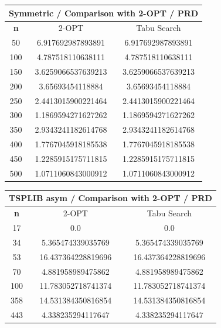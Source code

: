 \documentclass{article}
\begin{document}
\begin{center}
\begin{tabular}{|c|c|c|}
\hline
\multicolumn{3}{|c|}{\textbf{Symmetric / Comparison with 2-OPT / PRD}}\\
\hline
\textbf{n} & 2-OPT & Tabu Search\\
\hline
50 & 6.917692987893891 & 6.917692987893891\\
\hline
100 & 4.787518110638111 & 4.787518110638111\\
\hline
150 & 3.6259066537639213 & 3.6259066537639213\\
\hline
200 & 3.65693454118884 & 3.65693454118884\\
\hline
250 & 2.4413015900221464 & 2.4413015900221464\\
\hline
300 & 1.1869594271627262 & 1.1869594271627262\\
\hline
350 & 2.9343241182614768 & 2.9343241182614768\\
\hline
400 & 1.7767045918185538 & 1.7767045918185538\\
\hline
450 & 1.2285915175711815 & 1.2285915175711815\\
\hline
500 & 1.0711060843000912 & 1.0711060843000912\\
\hline
\end{tabular}
\end{center}


\begin{center}
\begin{tabular}{|c|c|c|}
\hline
\multicolumn{3}{|c|}{\textbf{TSPLIB asym / Comparison with 2-OPT / PRD}}\\
\hline
\textbf{n} & 2-OPT & Tabu Search\\
\hline
17 & 0.0 & 0.0\\
\hline
34 & 5.365474339035769 & 5.365474339035769\\
\hline
53 & 16.437364228819696 & 16.437364228819696\\
\hline
70 & 4.881958989475862 & 4.881958989475862\\
\hline
100 & 11.783052718741374 & 11.783052718741374\\
\hline
358 & 14.531384350816854 & 14.531384350816854\\
\hline
443 & 4.338235294117647 & 4.338235294117647\\
\hline
\end{tabular}
\end{center}
\end{document}
